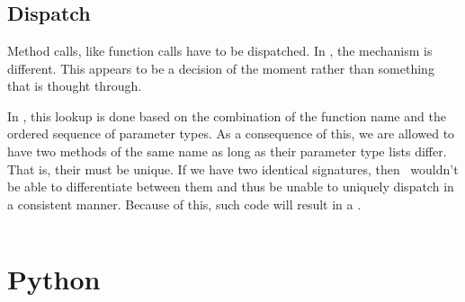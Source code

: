 \section{\csharp}


\begin{syntaxfloat}
  
  \caption{Class definitions.}
  \label{syntax:class}
\end{syntaxfloat}

\subsection{Dispatch}

Method calls, like function calls have to be dispatched. In \csharp, the mechanism is different. This appears to be a decision of the moment rather than something that is thought through\cite{csharp_ldm_2015_01_21}.

In \csharp, this lookup is done based on the combination of the function name and the ordered sequence of parameter types. As a consequence of this, we are allowed to have two methods of the same name as long as their parameter type lists differ. That is, their  must be unique. If we have two identical signatures, then \csharp\ wouldn't be able to differentiate between them and thus be unable to uniquely dispatch in a consistent manner. Because of this, such code will result in a .

\inputminted[]{csharp}{../src/csharp/objects/signature/Program.cs}


\section{Python}



